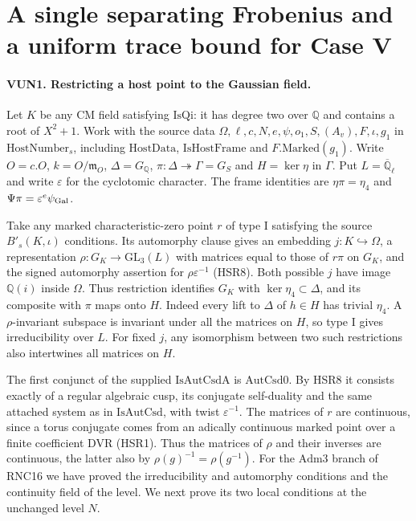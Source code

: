 \section{A single separating Frobenius and a uniform trace bound for Case V}
\label{sec:case-v-host-number}

\paragraph{VUN1. Restricting a host point to the Gaussian field.}
\label{claim:VUN1}
Let $K$ be any CM field satisfying $\mathrm{IsQi}$: it has degree
two over $\mathbb Q$ and contains a root of $X^2+1$. Work with the
source data $\Omega,\ell,c,N,e,\psi,o_1,S,(A_v),F,\iota,g_1$
in $\mathrm{HostNumber}_s$, including $\mathrm{HostData}$,
$\mathrm{IsHostFrame}$ and $F.\mathrm{Marked}(g_1)$. Write
$O=c.O$, $k=O/\mathfrak m_O$, $\Delta=G_{\mathbb Q}$,
$\pi:\Delta\twoheadrightarrow\Gamma=G_S$ and $H=\ker\eta$ in
$\Gamma$. Put $L=\overline{\mathbb Q}_\ell$ and write $\varepsilon$
for the cyclotomic character. The frame identities are
$\eta\pi=\eta_4$ and $\Psi\pi=\varepsilon^e\psi_{\rm Gal}$.

Take any marked characteristic-zero point $r$ of type I satisfying
the source $B'_s(K,\iota)$ conditions. Its automorphy clause gives
an embedding $j:K\hookrightarrow\Omega$, a representation
$\rho:G_K\to\mathrm{GL}_3(L)$ with matrices equal to those of
$r\pi$ on $G_K$, and the signed automorphy assertion for
$\rho\varepsilon^{-1}$ (HSR8). Both possible $j$ have image
$\mathbb Q(i)$ inside $\Omega$. Thus restriction identifies
$G_K$ with $\ker\eta_4\subset\Delta$, and its composite with
$\pi$ maps onto $H$. Indeed every lift to $\Delta$ of $h\in H$
has trivial $\eta_4$. A $\rho$-invariant subspace is invariant
under all the matrices on $H$, so type I gives irreducibility
over $L$. For fixed $j$, any isomorphism between two such
restrictions also intertwines all matrices on $H$.

The first conjunct of the supplied $\mathrm{IsAutCsdA}$ is
$\mathrm{AutCsd0}$. By HSR8 it consists exactly of a regular
algebraic cusp, its conjugate self-duality and the same attached
system as in $\mathrm{IsAutCsd}$, with twist $\varepsilon^{-1}$.
The matrices of $r$ are continuous, since a torus conjugate comes
from an adically continuous marked point over a finite coefficient
DVR (HSR1). Thus the matrices of $\rho$ and their inverses are
continuous, the latter also by $\rho(g)^{-1}=\rho(g^{-1})$.
For the $\mathrm{Adm3}$ branch of RNC16 we have proved the
irreducibility and automorphy conditions and the continuity field
of the level. We next prove its two local conditions at the
unchanged level $N$.

